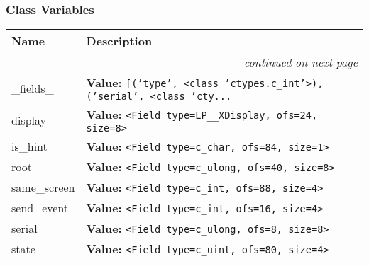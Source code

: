 
  \subsubsection{Class Variables}

    \vspace{-1cm}
\hspace{\varindent}\begin{longtable}{|p{\varnamewidth}|p{\vardescrwidth}|l}
\cline{1-2}
\cline{1-2} \centering \textbf{Name} & \centering \textbf{Description}& \\
\cline{1-2}
\endhead\cline{1-2}\multicolumn{3}{r}{\small\textit{continued on next page}}\\\endfoot\cline{1-2}
\endlastfoot\raggedright \_\-f\-i\-e\-l\-d\-s\-\_\- & \raggedright \textbf{Value:} 
{\tt \texttt{[}\texttt{(}\texttt{'}\texttt{type}\texttt{'}\texttt{, }{\textless}class 'ctypes.c\_int'{\textgreater}\texttt{)}\texttt{, }\texttt{(}\texttt{'}\texttt{serial}\texttt{'}\texttt{, }{\textless}class 'cty\texttt{...}}&\\
\cline{1-2}
\raggedright d\-i\-s\-p\-l\-a\-y\- & \raggedright \textbf{Value:} 
{\tt {\textless}Field type=LP\_\_XDisplay, ofs=24, size=8{\textgreater}}&\\
\cline{1-2}
\raggedright i\-s\-\_\-h\-i\-n\-t\- & \raggedright \textbf{Value:} 
{\tt {\textless}Field type=c\_char, ofs=84, size=1{\textgreater}}&\\
\cline{1-2}
\raggedright r\-o\-o\-t\- & \raggedright \textbf{Value:} 
{\tt {\textless}Field type=c\_ulong, ofs=40, size=8{\textgreater}}&\\
\cline{1-2}
\raggedright s\-a\-m\-e\-\_\-s\-c\-r\-e\-e\-n\- & \raggedright \textbf{Value:} 
{\tt {\textless}Field type=c\_int, ofs=88, size=4{\textgreater}}&\\
\cline{1-2}
\raggedright s\-e\-n\-d\-\_\-e\-v\-e\-n\-t\- & \raggedright \textbf{Value:} 
{\tt {\textless}Field type=c\_int, ofs=16, size=4{\textgreater}}&\\
\cline{1-2}
\raggedright s\-e\-r\-i\-a\-l\- & \raggedright \textbf{Value:} 
{\tt {\textless}Field type=c\_ulong, ofs=8, size=8{\textgreater}}&\\
\cline{1-2}
\raggedright s\-t\-a\-t\-e\- & \raggedright \textbf{Value:} 
{\tt {\textless}Field type=c\_uint, ofs=80, size=4{\textgreater}}&\\

\end{longtable}
